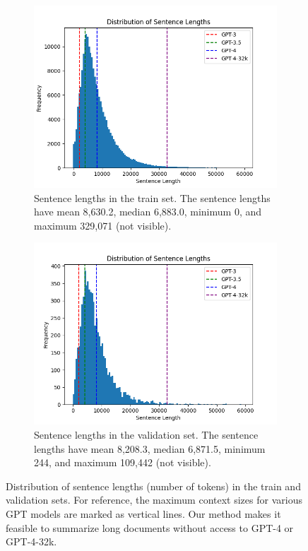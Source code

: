 \documentclass{article}
\begin{document}
\begin{figure}[!ht]
  \centering
  \begin{subfigure}{0.45\textwidth}
    \centering
    \includegraphics[width=\linewidth]{images/length_hist_train.png}
    \caption{Sentence lengths in the train set. The sentence lengths have mean 8,630.2, median 6,883.0, minimum 0, and maximum 329,071 (not visible).}\label{fig:train-hist}
  \end{subfigure}
  \hfill
  \begin{subfigure}{0.45\textwidth}
    \centering
    \includegraphics[width=\linewidth]{images/length_hist_validation.png}
    \caption{Sentence lengths in the validation set. The sentence lengths have mean 8,208.3, median 6,871.5, minimum 244, and maximum 109,442 (not visible).}\label{fig:val-hist}
  \end{subfigure}
  \caption{Distribution of sentence lengths (number of tokens) in the train and validation sets. For reference, the maximum context sizes for various GPT models are marked as vertical lines. Our method makes it feasible to summarize long documents without access to GPT-4 or GPT-4-32k.}\label{fig:length-hist}
\end{figure}
\end{document}

